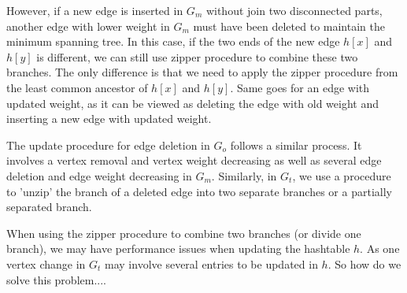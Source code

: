 However, if a new edge is inserted in $G_m$ without join two disconnected parts, another edge with lower weight in $G_m$ must have been deleted to maintain the minimum spanning tree. In this case, if the two ends of the new edge $h[x]$ and $h[y]$ is different, we can still use zipper procedure to combine these two branches. The only difference is that we need to apply the zipper procedure from the least common ancestor of $h[x]$ and $h[y]$. Same goes for an edge with updated weight, as it can be viewed as deleting the edge with old weight and inserting a new edge with updated weight.

The update procedure for edge deletion in $G_o$ follows a similar process. It involves a vertex removal and vertex weight decreasing as well as several edge deletion and edge weight decreasing in $G_m$. Similarly, in $G_t$, we use a procedure to 'unzip' the branch of a deleted edge into two separate branches or a partially separated branch.

When using the zipper procedure to combine two branches (or divide one branch), we may have performance issues when updating the hashtable $h$. As one vertex change in $G_t$ may involve several entries to be updated in $h$. So how do we solve this problem....



